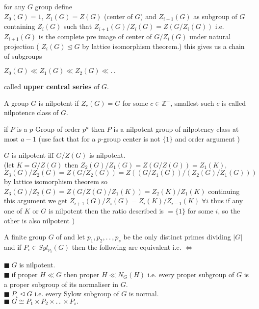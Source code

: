 \documentclass[11pt]{extarticle}
\newcommand{\Z}{\mathbb{Z}}
\newcommand{\ck}{.\,.\,}
\newcommand{\snote}[1]{{\footnotesize(#1)}}
\newcommand{\y}{$\blacksquare\;$}
\newcommand{\tbx}[2][]{
	\begin{tcolorbox}[enhanced,breakable,size=small,colback=black!2!white,title={#1},arc is angular, arc=1.5mm,drop fuzzy shadow]
		#2
	\end{tcolorbox}
}
\begin{document}
\begin{multicols}{2}
	\tbx{for any $ G $ group define \\
		$ Z_0(G)=1,\, Z_1(G)=Z(G) $ (center of $ G $) and $ Z_{i+1}(G) $ as subgroup of $ G $ containing $ Z_i(G) $ such that $ Z_{i+1}(G)/Z_{i}(G)=Z(G/Z_i(G)) $ i.e. $ Z_{i+1}(G) $ is the complete pre image of center of $ G/Z_i(G) $ under natural projection \snote{ $ Z_i(G) \trianglelefteq G $ by lattice isomorphism theorem.} this gives us a chain of subgroups  
		\begin{center}
			$ Z_0(G) \ll Z_1(G)\ll Z_2(G)\ll \ck $
		\end{center}  called \textbf{upper central series} of $ G. $
	}
	\tbx{A group $ G $ is nilpotent if $ Z_c(G)=G $ for some $ c\in \Z^+ $, smallest such $ c $ is called nilpotence class of $ G. $
	}
	\tbx{if $ P $ is a $p$-Group of order $ p^a $ then $ P $ is a nilpotent group of nilpotency class at most $ a-1 $
\snote{use fact that for a $ p $-group center is not $ \{1\} $ and order argument }	}
	\tbx{ $ G $ is nilpotent iff $ G/Z(G) $ is nilpotent.\\
		\snote{let $K=G/Z(G) $ then $ Z_2(G)/Z_1(G)=Z(G/Z(G)) =Z_1(K)$, $ Z_3(G)/Z_2(G)=Z(G/Z_2(G))= Z((G/Z_1(G))/(Z_2(G)/Z_1(G)))$ by lattice isomorphism theorem so $Z_3(G)/Z_2(G)=Z(G/Z(G)/Z_1(K))=Z_2(K)/Z_1(K)$ continuing this argument we get $ Z_{i+1}(G)/Z_i(G)=Z_i(K)/Z_{i-1}(K) \; \forall i$ thus if any one of $ K $ or $ G $ is nilpotent then the ratio described is $= \{1\} $ for some $ i $, so the other is also nilpotent }
	}
	\tbx{A finite group $ G$ of  and let $ p_1,p_2,\ck ,p_s $ be the only distinct primes dividing $ |G| $ and if $ P_i\in Syl_{p_i}(G) $ then the following are equivalent i.e. $ \iff $
		
			\y  $ G $ is nilpotent. \\
			\y  if  proper $ H\ll G $ then proper $H \ll N_G(H)  $ i.e. every proper subgroup of $ G $ is a proper subgroup of its normaliser in $ G. $ \\
			\y  $ P_i \trianglelefteq G$ i.e. every Sylow subgroup of $ G $ is normal. \\
			\y  $ G \cong P_1\times P_2 \times \ck \times P_s. $ 
		
}
\end{multicols}
\end{document}
